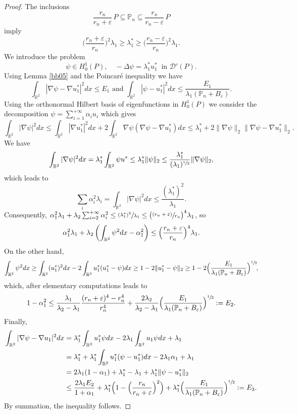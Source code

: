 \documentclass[JEP,XML,SOM,Unicode,ThmDefs,NoFloatCountersInSection,published]{cedram}
\newcommand{\psfrac}[2]{\sfrac{(#1)}{#2}}
\theoremstyle{plain}
\theoremstyle{definition}
\let\Bbb\mathbb
\newcommand{\vps}{\varepsilon}
\newcommand{\lb}{\lambda}
\newcommand{\sq}{\subseteq}
\begin{document}
\begin{proof}
The inclusions
\[
\frac{r_n}{r_n+\vps}\, P \sq \Bbb P_n \sq \frac{r_n}{r_n-\vps}\, P
\]
imply
\[
\Big (\frac{r_n+\vps} {r_n}\Big)^2\lb_1\ge \lb_1^* \ge \Big (\frac{r_n-\vps} {r_n}\Big)^2\lb_1.
\]
We introduce the problem
\[
\psi \in H^1_0(P),\quad -\Delta \psi = \lb_1^* u_1^* \ \mbox{ in } {\mathcal D'}(P).
\]
Using Lemma \ref{bb05} and the Poincaré inequality we have
\[
\int_{\Bbb{R}^2} |\nabla \psi -\nabla u_1^*|^2 dx \le E_1 \text{ and } \int_{\Bbb{R}^2} | \psi - u_1^*|^2 dx\le \frac{E_1}{\lb_1(\Bbb P_n+ B_\vps)}.
\]
Using the orthonormal Hilbert basis of eigenfunctions in $H^1_0(P)$ we consider the decom\-position
$\psi=\sum_{i=1}^{+\infty} \alpha_i u_i$ which gives
\[
\int_{\Bbb{R}^2} |\nabla \psi |^2 dx \le \int_{\Bbb{R}^2} |\nabla u_1^* |^2 dx + 2 \int_{\Bbb{R}^2} \nabla \psi (\nabla \psi -\nabla u_1^*) dx\le \lb_1^*+ 2 \|\nabla \psi\|_2 \|\nabla \psi-\nabla u_1^*\|_2.
\]
We have
\[
\int_{\Bbb{R}^2} |\nabla \psi |^2 dx = \lb_1^* \int_{\Bbb{R}^2} \psi u^*\le \lb_1^* \|\psi \|_2\le \frac{\lb_1^*}{(\lb_1)^{\sfrac 12}} \|\nabla \psi \|_2,
\]
which leads to
\[
\sum_i \alpha_i^2 \lb_i = \int_{\Bbb{R}^2} |\nabla \psi |^2 dx \le \frac{(\lb_1^*)^2}{\lb_1 }.
\]
Consequently,
$\alpha_1^2 \lb_1 + \lb_2 \sum _{i=2}^{+\infty} \alpha_i^2\le \sfrac{(\lb_1^*)^2}{\lb_1 }\le\big (\psfrac{r_n+\vps} {r_n}\big)^4\lb_1$,
so
\[
\alpha_1^2 \lb_1 + \lb_2 \left(\int_{\Bbb{R}^2} \psi^2dx -\alpha_1^2\right) \le \Bigl(\frac{r_n+\vps} {r_n}\Bigr)^4\lb_1.
\]
On the other hand,
\[
\int_{\Bbb{R}^2} \psi^2dx \ge \int_{\Bbb{R}^2} (u_1^*)^2 dx- 2 \int_{\Bbb{R}^2} u_1^*(u_1^*-\psi) dx \ge 1-2\|u_1^*-\psi\|_2 \ge 1-2\Bigl(\frac{E_1}{\lb_1(\mathbb P_n+ B_\vps)}\Bigr)^{\sfrac12}\!,
\]
which, after elementary computations leads to
\[
1-\alpha_1^2 \le \frac{\lb_1}{\lb_2-\lb_1}\frac{(r_n+\vps)^4-r_n^4}{r_n^4} + \frac{2\lb_2}{\lb_2-\lb_1}\Bigl(\frac{E_1}{\lb_1(\mathbb P_n+ B_\vps)}\Bigr)^{\sfrac12}:= E_2.
\]
Finally,
\begin{align*}
\int_{\Bbb{R}^2}|\nabla \psi -\nabla u_1 |^2 dx &= \lb_1^*\int_{\Bbb{R}^2} u_1^* \psi dx -2\lb_1\int_{\Bbb{R}^2} u_1 \psi dx+ \lb_1
\\
&=\lb_1^*+ \lb_1^*\int_{\Bbb{R}^2} u_1^* (\psi -u_1^*)dx-2\lb_1 \alpha_1+ \lb_1
\\
&= 2 \lb_1(1-\alpha_1)+ \lb_1^*-\lb_1+ \lb_1^* \|\psi -u_1^*\|_2
\\
&\le \frac{2 \lb_1 E_2}{1+\alpha_1}+\lb_1^*\Bigl(1- \Bigl(\frac{r_n}{r_n+\vps }\Bigr)^2\Bigr)+\lb_1^* \Bigl(\frac{E_1}{\lb_1(\mathbb P_n+ B_\vps)}\Bigr)^{\sfrac12}:=E_3.
\end{align*}
By summation, the inequality follows.
\end{proof}
\end{document}
